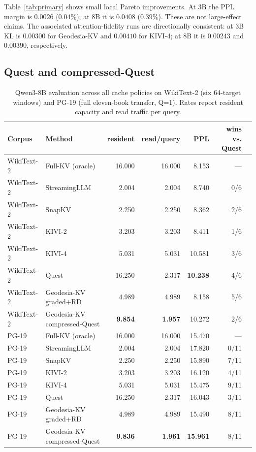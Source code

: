 \documentclass[10pt,twocolumn]{article}
\newcommand{\method}{Geodesia-KV}
\newcommand{\wikitext}{WikiText-2}
\newcommand{\pg}{PG-19}
\begin{document}
Table~\ref{tab:primary} shows small local Pareto improvements. At 3B the PPL
margin is $0.0026$ ($0.04\%$); at 8B it is $0.0408$ ($0.39\%$). These are not
large-effect claims. The associated attention-fidelity runs are directionally
consistent: at 3B KL is $0.00300$ for \method{} and $0.00410$ for KIVI-4; at
8B it is $0.00243$ and $0.00390$, respectively.

\subsection{Quest and compressed-Quest}

\begin{table}[t]
\centering\small
\caption{Qwen3-8B evaluation across all cache policies on \wikitext{} (six 64-target windows) and \pg{} (full eleven-book transfer, Q=1). Rates report resident capacity and read traffic per query.}
\label{tab:sparse}
\begin{tabular}{llrrrrr}
\toprule
Corpus & Method & resident & read/query & PPL & wins vs. Quest \\
\midrule
\wikitext{} & Full-KV (oracle) & 16.000 & 16.000 & 8.153 & --- \\
\wikitext{} & StreamingLLM & 2.004 & 2.004 & 8.740 & 0/6 \\
\wikitext{} & SnapKV & 2.250 & 2.250 & 8.362 & 2/6 \\
\wikitext{} & KIVI-2 & 3.203 & 3.203 & 8.411 & 1/6 \\
\wikitext{} & KIVI-4 & 5.031 & 5.031 & 10.581 & 3/6 \\
\wikitext{} & Quest & 16.250 & 2.317 & \textbf{10.238} & 4/6 \\
\wikitext{} & \method{} graded+RD & 4.989 & 4.989 & 8.158 & 5/6 \\
\wikitext{} & \method{} compressed-Quest & \textbf{9.854} & \textbf{1.957} & 10.272 & 2/6 \\
\midrule
\pg{} & Full-KV (oracle) & 16.000 & 16.000 & 15.470 & --- \\
\pg{} & StreamingLLM & 2.004 & 2.004 & 17.820 & 0/11 \\
\pg{} & SnapKV & 2.250 & 2.250 & 15.890 & 7/11 \\
\pg{} & KIVI-2 & 3.203 & 3.203 & 16.120 & 4/11 \\
\pg{} & KIVI-4 & 5.031 & 5.031 & 15.475 & 9/11 \\
\pg{} & Quest & 16.250 & 2.317 & 16.043 & 3/11 \\
\pg{} & \method{} graded+RD & 4.989 & 4.989 & 15.490 & 8/11 \\
\pg{} & \method{} compressed-Quest & \textbf{9.836} & \textbf{1.961} & \textbf{15.961} & 8/11 \\
\bottomrule
\end{tabular}
\end{table}
\end{document}
